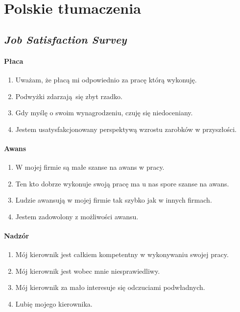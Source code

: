 \appendix
\section{Polskie tłumaczenia}

\subsection{\emph{Job Satisfaction Survey}}
\paragraph{Płaca}
\begin{enumerate}
  \item Uważam, że płacą mi odpowiednio za pracę którą wykonuję.
  \item Podwyżki zdarzają się zbyt rzadko.
  \item Gdy myślę o swoim wynagrodzeniu, czuję się niedoceniany.
  \item Jestem usatysfakcjonowany perspektywą wzrostu zarobków w przyszłości.
\end{enumerate}

\paragraph{Awans}
\begin{enumerate}
  \item W mojej firmie są małe szanse na awans w pracy.
  \item Ten kto dobrze wykonuje swoją pracę ma u nas spore szanse na awans.
  \item Ludzie awansują w mojej firmie tak szybko jak w innych firmach.
  \item Jestem zadowolony z możliwości awansu.
\end{enumerate}

\paragraph{Nadzór}
\begin{enumerate}
  \item Mój kierownik jest całkiem kompetentny w wykonywaniu swojej pracy.
  \item Mój kierownik jest wobec mnie niesprawiedliwy.
  \item Mój kierownik za mało interesuje się odczuciami podwładnych.
  \item Lubię mojego kierownika.
\end{enumerate}

